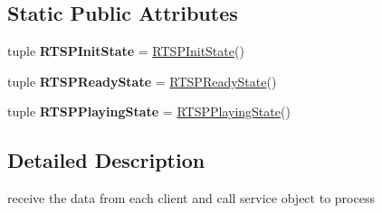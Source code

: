 \subsection*{Static Public Attributes}
\begin{DoxyCompactItemize}
\item 
\hypertarget{classpython_1_1streamserver_1_1server_1_1rtspServer_1_1RTSPServerProtocol_aa0f9b8166b50509c82af19afebbd215a}{
tuple {\bfseries RTSPInitState} = \hyperlink{classpython_1_1streamserver_1_1server_1_1rtspServer_1_1RTSPInitState}{RTSPInitState}()}
\label{classpython_1_1streamserver_1_1server_1_1rtspServer_1_1RTSPServerProtocol_aa0f9b8166b50509c82af19afebbd215a}

\item 
\hypertarget{classpython_1_1streamserver_1_1server_1_1rtspServer_1_1RTSPServerProtocol_a6f3bc2ace1ef5dfb7e0280ca1e77551e}{
tuple {\bfseries RTSPReadyState} = \hyperlink{classpython_1_1streamserver_1_1server_1_1rtspServer_1_1RTSPReadyState}{RTSPReadyState}()}
\label{classpython_1_1streamserver_1_1server_1_1rtspServer_1_1RTSPServerProtocol_a6f3bc2ace1ef5dfb7e0280ca1e77551e}

\item 
\hypertarget{classpython_1_1streamserver_1_1server_1_1rtspServer_1_1RTSPServerProtocol_abb2b91dbe63ca26f436aa3d199ed5c39}{
tuple {\bfseries RTSPPlayingState} = \hyperlink{classpython_1_1streamserver_1_1server_1_1rtspServer_1_1RTSPPlayingState}{RTSPPlayingState}()}
\label{classpython_1_1streamserver_1_1server_1_1rtspServer_1_1RTSPServerProtocol_abb2b91dbe63ca26f436aa3d199ed5c39}

\end{DoxyCompactItemize}


\subsection{Detailed Description}
\begin{DoxyVerb}receive the data from each client and call service object to process\end{DoxyVerb}
 

